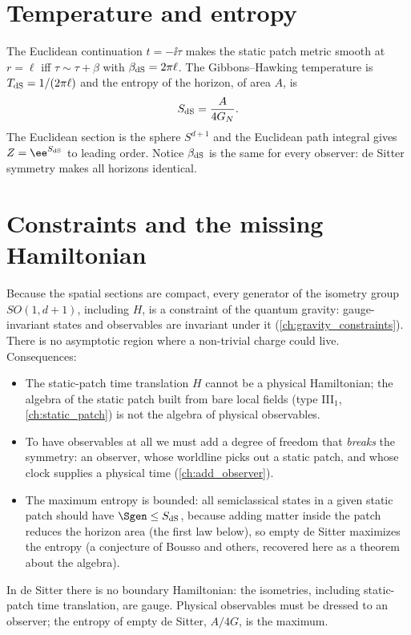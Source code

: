 \section{Temperature and entropy}

The Euclidean continuation $t=-\ii\tau$ makes the static patch metric smooth at $r=\ell$ iff $\tau\sim\tau+\beta$ with $\beta_{\rm dS}=2\pi\ell$. The Gibbons--Hawking temperature is $T_{\rm dS}=1/(2\pi\ell)$ and the entropy of the horizon, of area $A$, is
\begin{equation}
S_{\rm dS}=\frac{A}{4G_N}.
\end{equation}
The Euclidean section is the sphere $S^{d+1}$ and the Euclidean path integral gives $Z=\ee^{S_{\rm dS}}$ to leading order. Notice $\beta_{\rm dS}$ is the same for every observer: de Sitter symmetry makes all horizons identical.

\section{Constraints and the missing Hamiltonian}

Because the spatial sections are compact, every generator of the isometry group $SO(1,d+1)$, including $H$, is a constraint of the quantum gravity: gauge-invariant states and observables are invariant under it (\cref{ch:gravity_constraints}). There is no asymptotic region where a non-trivial charge could live. Consequences:
\begin{itemize}
\item The static-patch time translation $H$ cannot be a physical Hamiltonian; the algebra of the static patch built from bare local fields (type III$_1$, \cref{ch:static_patch}) is not the algebra of physical observables.
\item To have observables at all we must add a degree of freedom that \emph{breaks} the symmetry: an observer, whose worldline picks out a static patch, and whose clock supplies a physical time (\cref{ch:add_observer}).
\item The maximum entropy is bounded: all semiclassical states in a given static patch should have $\Sgen\le S_{\rm dS}$, because adding matter inside the patch reduces the horizon area (the first law below), so empty de Sitter maximizes the entropy (a conjecture of Bousso and others, recovered here as a theorem about the algebra).
\end{itemize}

\begin{keyidea}
In de Sitter there is no boundary Hamiltonian: the isometries, including static-patch time translation, are gauge. Physical observables must be dressed to an observer; the entropy of empty de Sitter, $A/4G$, is the maximum.
\end{keyidea}

